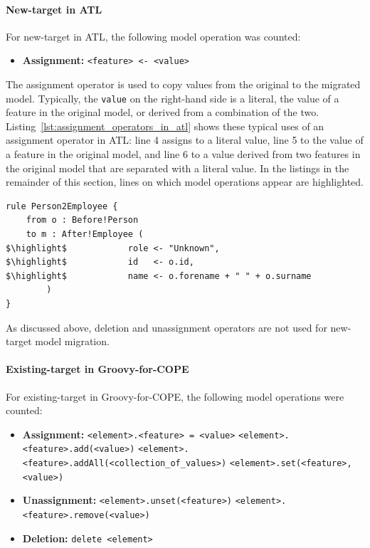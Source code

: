 \paragraph{New-target in ATL}
For new-target in ATL, the following model operation was counted:
	
\begin{itemize}
	\item \textbf{Assignment:}
	\subitem \texttt{<feature> <- <value>} 
\end{itemize}

The assignment operator is used to copy values from the original to the migrated model. Typically, the \texttt{value} on the right-hand side is a literal, the value of a feature in the original model, or derived from a combination of the two. Listing~\ref{lst:assignment_operators_in_atl} shows these typical uses of an assignment operator in ATL: line 4 assigns to a literal value, line 5 to the value of a feature in the original model, and line 6 to a value derived from two features in the original model that are separated with a literal value. In the listings in the remainder of this section, lines on which model operations appear are highlighted.

\begin{lstlisting}[caption=Assignment operators in ATL, label=lst:assignment_operators_in_atl, language=ATL]
rule Person2Employee {
	from o : Before!Person
	to m : After!Employee (
$\highlight$			role <- "Unknown",
$\highlight$			id   <- o.id,
$\highlight$			name <- o.forename + " " + o.surname
		)
}
\end{lstlisting}

As discussed above, deletion and unassignment operators are not used for new-target model migration.


\paragraph{Existing-target in Groovy-for-COPE}
For existing-target in Groovy-for-COPE, the following model operations were counted:

\begin{itemize}
	\item \textbf{Assignment:}
	\subitem \texttt{<element>.<feature> = <value>}
	\subitem \texttt{<element>.<feature>.add(<value>)}
	\subitem \texttt{<element>.<feature>.addAll(<collection\_of\_values>)}
	\subitem \texttt{<element>.set(<feature>, <value>)}
	
	\item \textbf{Unassignment:}
	\subitem \texttt{<element>.unset(<feature>)}
	\subitem \texttt{<element>.<feature>.remove(<value>)}
	
	\item \textbf{Deletion:}
	\subitem \texttt{delete <element>}
\end{itemize}

